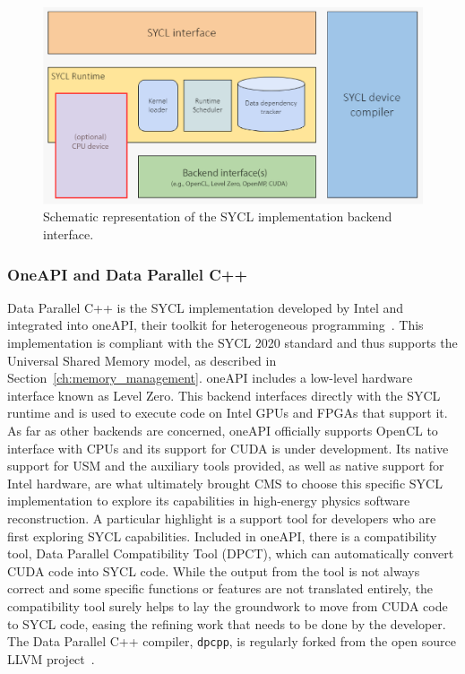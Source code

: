 \begin{figure}[H]
    \centering
    \includegraphics[width=\textwidth]{media/ex_sycl_implementation.png}
    \caption{Schematic representation of the SYCL implementation backend interface.}
    \label{fig:sycl_implementations_backend}
\end{figure}

\subsubsection{OneAPI and Data Parallel C++}
Data Parallel C++ is the SYCL implementation developed by Intel and integrated into oneAPI, their toolkit for heterogeneous programming~\cite{oneAPI}. This implementation is compliant with the SYCL 2020 standard and thus supports the Universal Shared Memory model, as described in Section~\ref{ch:memory_management}. oneAPI includes a low-level hardware interface known as Level Zero. This backend interfaces directly with the SYCL runtime and is used to execute code on Intel GPUs and FPGAs that support it. As far as other backends are concerned, oneAPI officially supports OpenCL to interface with CPUs and its support for CUDA is under development. Its native support for USM and the auxiliary tools provided, as well as native support for Intel hardware, are what ultimately brought CMS to choose this specific SYCL implementation to explore its capabilities in high-energy physics software reconstruction. A particular highlight is a support tool for developers who are first exploring SYCL capabilities. Included in oneAPI, there is a compatibility tool, Data Parallel Compatibility Tool (DPCT), which can automatically convert CUDA code into SYCL code. While the output from the tool is not always correct and some specific functions or features are not translated entirely, the compatibility tool surely helps to lay the groundwork to move from CUDA code to SYCL code, easing the refining work that needs to be done by the developer.
The Data Parallel C++ compiler, \texttt{dpcpp}, is regularly forked from the open source LLVM project~\cite{dpcpp}.

